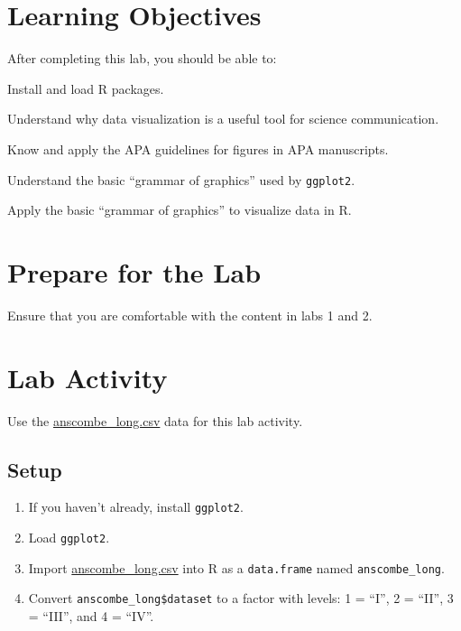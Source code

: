 \documentclass[
]{book}
\providecommand{\tightlist}{%
  \setlength{\itemsep}{0pt}\setlength{\parskip}{0pt}}
\begin{document}
\hypertarget{learning-objectives-2}{%
\section{Learning Objectives}\label{learning-objectives-2}}

After completing this lab, you should be able to:

Install and load R packages.

Understand why data visualization is a useful tool for science communication.

Know and apply the APA guidelines for figures in APA manuscripts.

Understand the basic ``grammar of graphics'' used by \texttt{ggplot2}.

Apply the basic ``grammar of graphics'' to visualize data in R.

\hypertarget{prepare-for-the-lab-2}{%
\section{Prepare for the Lab}\label{prepare-for-the-lab-2}}

Ensure that you are comfortable with the content in labs 1 and 2.

\hypertarget{lab-activity-2}{%
\section{Lab Activity}\label{lab-activity-2}}

Use the \href{dta/anscombe_long.csv}{anscombe\_long.csv} data for this lab activity.

\hypertarget{setup}{%
\subsection{Setup}\label{setup}}

\begin{enumerate}
\def\labelenumi{\arabic{enumi}.}
\tightlist
\item
  If you haven't already, install \texttt{ggplot2}.
\item
  Load \texttt{ggplot2}.
\item
  Import \href{dta/anscombe_long.csv}{anscombe\_long.csv} into R as a \texttt{data.frame} named \texttt{anscombe\_long}.
\item
  Convert \texttt{anscombe\_long\$dataset} to a factor with levels: 1 = ``I'', 2 = ``II'', 3 = ``III'', and 4 = ``IV''.
\end{enumerate}
\end{document}
